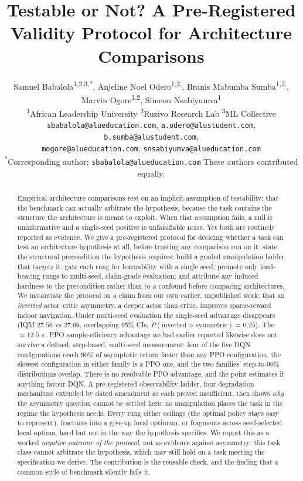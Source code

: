 \documentclass[10pt]{article}
\title{Testable or Not? A Pre-Registered Validity Protocol for Architecture Comparisons}
\author{%
  Samuel Babalola\textsuperscript{1,2,3,*},
  Anjeline Noel Odero\textsuperscript{1,2,\dag},
  Branis Mabumba Sumba\textsuperscript{1,2,\dag},\\[0.35ex]
  Marvin Ogore\textsuperscript{1,2},
  Simeon Nsabiyumva\textsuperscript{1}\\[1.0ex]
  {\normalfont\small
   \textsuperscript{1}African Leadership University\quad
   \textsuperscript{2}Ruzivo Research Lab\quad
   \textsuperscript{3}ML Collective\\[0.55ex]
   \texttt{sbabalola@alueducation.com}, \texttt{a.odero@alustudent.com}, \texttt{b.sumba@alustudent.com},\\[0.15ex]
   \texttt{mogore@alueducation.com}, \texttt{snsabiyumva@alueducation.com}\\[0.55ex]
   \textsuperscript{*}Corresponding author: \texttt{sbabalola@alueducation.com}\quad
   \textsuperscript{\dag}These authors contributed equally.}
}
\begin{document}
\maketitle

\begin{abstract}
Empirical architecture comparisons rest on an implicit assumption of testability: that the
benchmark can actually arbitrate the hypothesis, because the task contains the structure the
architecture is meant to exploit. When that assumption fails, a null is uninformative and a single-seed positive
is unfalsifiable noise. Yet both are routinely reported as evidence. We give a
pre-registered protocol for deciding whether a task can test an architecture
hypothesis at all, before trusting any comparison run on it: state the structural
precondition the hypothesis requires; build a graded manipulation ladder that targets it;
gate each rung for learnability with a single seed; promote only load-bearing rungs to
multi-seed, claim-grade evaluation; and attribute any induced hardness to the precondition
rather than to a confound before comparing architectures. We instantiate the protocol on a
claim from our own earlier, unpublished work: that an \emph{inverted} actor--critic
asymmetry, a deeper actor than critic, improves sparse-reward indoor navigation. Under
multi-seed evaluation the single-seed advantage disappears (IQM $27.56$ vs $27.66$,
overlapping 95\% CIs, $P(\text{inverted} > \text{symmetric}) = 0.25$). The
${\approx}12.5\times$ PPO sample-efficiency advantage we had earlier reported likewise does
not survive a defined, step-based, multi-seed measurement: four of the five DQN
configurations reach 90\% of asymptotic return faster than any PPO configuration, the
slowest configuration in either family is a PPO one, and the two families' step-to-90\%
distributions overlap. There is no resolvable PPO advantage, and the point estimates if
anything favour DQN. A pre-registered observability ladder, four degradation mechanisms
extended by dated amendment as each proved insufficient, then shows \emph{why} the
asymmetry question cannot be settled here: no manipulation places the task in the regime
the hypothesis needs. Every rung either ceilings (the optimal policy stays easy to
represent), fractures into a give-up local optimum, or fragments across
seed-selected local optima, hard but not in the way the hypothesis specifies. We report
this as a worked \emph{negative outcome of the protocol}, not as evidence against
asymmetry: this task class cannot arbitrate the hypothesis, which may still hold on a task
meeting the specification we derive. The contribution is the reusable check, and the
finding that a common style of benchmark silently fails it.
\end{abstract}
\end{document}
